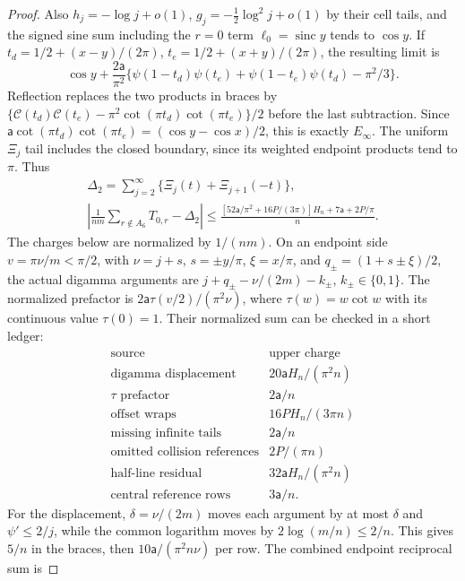 \begin{proof}
Also $h_j=-\log j+o(1)$, $g_j=-\tfrac12\log^2j+o(1)$ by their
cell tails, and the signed sine sum including the $r=0$ term
$\ell_0=\operatorname{sinc}y$ tends to
$\cos y$. If $t_d=1/2+(x-y)/(2\pi)$,
$t_e=1/2+(x+y)/(2\pi)$, the resulting limit is
\[
 \cos y+\frac{2\mathsf{a}}{\pi^2}
 \{\psi(1-t_d)\psi(t_e)+\psi(1-t_e)\psi(t_d)-\pi^2/3\}.
\]
Reflection replaces the two products in braces by
$\{\mathcal C(t_d)\mathcal C(t_e)-\pi^2\cot(\pi t_d)
\cot(\pi t_e)\}/2$ before the last subtraction.
Since $\mathsf{a}\cot(\pi t_d)\cot(\pi t_e)=(\cos y-\cos x)/2$,
this is exactly $E_\infty$.
The uniform $\Xi_j$ tail includes the closed boundary, since its
weighted endpoint products tend to $\pi$. Thus
\begin{equation}\label{uc:reference-match}
 \begin{gathered}
 \Delta_2=\sum_{j=2}^\infty\{\Xi_j(t)+\Xi_{j+1}(-t)\},\\
 \left|\frac1{nm}\sum_{r\notin A_6}T_{0,r}-\Delta_2\right|
 \leq\frac{[52\mathsf{a}/\pi^2+16P/(3\pi)]H_n+7\mathsf{a}+2P/\pi}{n}.
 \end{gathered}
\end{equation}
The charges below are normalized by $1/(nm)$. On an endpoint side
$v=\pi\nu/m<\pi/2$, with $\nu=j+s$, $s=\pm y/\pi$,
$\xi=x/\pi$, and $q_\pm=(1+s\pm\xi)/2$,
the actual digamma arguments are
$j+q_\pm-\nu/(2m)-k_\pm$, $k_\pm\in\{0,1\}$.
The normalized prefactor is
$2\mathsf a\tau(v/2)/(\pi^2\nu)$, where $\tau(w)=w\cot w$
with its continuous value $\tau(0)=1$. Their normalized sum can be checked in a short ledger:
\[
\begin{array}{cc}
 \text{source}&\text{upper charge}\\ \hline
 \text{digamma displacement}&20\mathsf{a}H_n/(\pi^2n)\\
 \tau\text{ prefactor}&2\mathsf{a}/n\\
 \text{offset wraps}&16PH_n/(3\pi n)\\
 \text{missing infinite tails}&2\mathsf{a}/n\\
 \text{omitted collision references}&2P/(\pi n)\\
 \text{half-line residual}&32\mathsf{a}H_n/(\pi^2n)\\
 \text{central reference rows}&3\mathsf{a}/n.
\end{array}
\]
For the displacement, $\delta=\nu/(2m)$ moves each argument by
at most $\delta$ and $\psi'\leq2/j$, while the common logarithm
moves by $2\log(m/n)\leq2/n$. This gives $5/n$ in the braces,
then $10\mathsf{a}/(\pi^2n\nu)$ per row. The combined endpoint reciprocal sum is

\end{proof}
